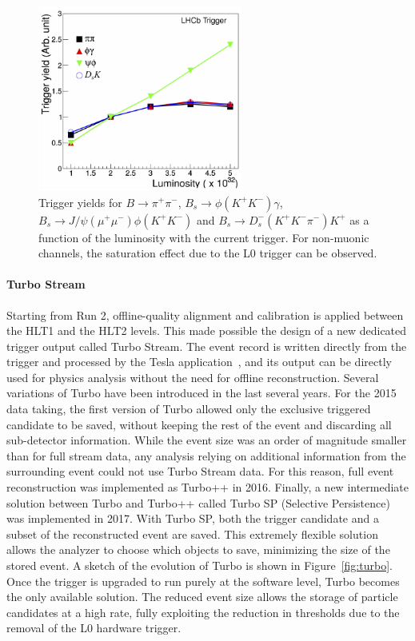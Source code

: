\begin{figure}[t]
\centerline{\includegraphics[width=0.6\textwidth]{figures/L0vsLumi.pdf}}
\caption{Trigger yields for ${B\to\pi^+\pi^-}$, ${B_s\to\phi(K^+K^-)\gamma}$, ${B_s\to J/\psi(\mu^+\mu^-)\phi(K^+K^-)}$ and ${B_s\to D_s^-(K^+K^-\pi^-)K^+}$ as a function of the luminosity with the current trigger. For non-muonic channels, the saturation effect due to the L0 trigger can be observed.}
  \label{fig:triggervsLumi}
\end{figure}

\paragraph{Turbo Stream}
Starting from Run 2, offline-quality alignment and calibration is applied between the HLT1 and the HLT2 levels. This made possible the design of a new dedicated
trigger output called Turbo Stream. The event record is written directly from the trigger and processed by the Tesla application~\cite{Aaij:2016rxn}, and its output can be directly used for physics analysis without the need for offline reconstruction.
Several variations of Turbo have been introduced in the last several years. For the 2015 data taking, the first version of Turbo allowed only the exclusive triggered candidate to be saved, without keeping the rest of the event and discarding all sub-detector information. 
While the event size was an order of magnitude smaller than for full stream data, any analysis relying on additional information from the surrounding event could not use Turbo Stream data. 
For this reason, full event reconstruction was implemented as Turbo++ in 2016. Finally, a new intermediate solution between Turbo and Turbo++ called Turbo SP (Selective Persistence) was implemented in 2017. With Turbo SP, both the trigger candidate and a subset of the reconstructed event are saved. This extremely flexible solution allows the analyzer to choose which objects to save, minimizing the size of the stored event. A sketch of the evolution of Turbo is shown in Figure~\ref{fig:turbo}.
Once the trigger is upgraded to run purely at the software level, Turbo becomes the only available solution. The reduced event size allows the storage of particle candidates at a high rate, fully exploiting the reduction in \pt thresholds due to the removal of the L0 hardware trigger.  


